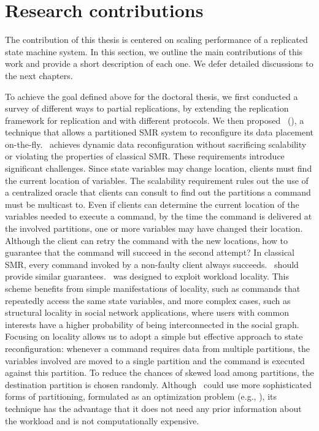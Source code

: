 \section{Research contributions}
\label{sec:contribution}


The contribution of this thesis is centered on scaling performance of a
replicated state machine system. In this section, we outline the main
contributions of this work and provide a short description of each one. We defer
detailed discussions to the next chapters.


To achieve the goal defined above for the doctoral thesis, we first conducted a
survey of different ways to partial replications, by extending the replication
framework for replication \cite{pedone:replication} and with different protocols.
We then proposed \textbf{\dssmrlong}\ (\dssmr), a technique that allows a
partitioned SMR system to reconfigure its data placement on-the-fly. \dssmr\
achieves dynamic data reconfiguration without sacrificing scalability or
violating the properties of classical SMR. These requirements introduce
significant challenges. Since state variables may change location, clients must
find the current location of variables. The scalability requirement rules out
the use of a centralized oracle that clients can consult to find out the
partitions a command must be multicast to. Even if clients can determine the
current location of the variables needed to execute a command, by the time the
command is delivered at the involved partitions, one or more variables may have
changed their location. Although the client can retry the command with the new
locations, how to guarantee that the command will succeed in the second attempt?
In classical SMR, every command invoked by a non-faulty client always succeeds.
\dssmr\ should provide similar guarantees. \dssmr\ was designed to exploit
workload locality. This scheme benefits from simple manifestations of locality,
such as commands that repeatedly access the same state variables, and more
complex cases, such as structural locality in social network applications, where
users with common interests have a higher probability of being interconnected in
the social graph. Focusing on locality allows us to adopt a simple but effective
approach to state reconfiguration: whenever a command requires data from
multiple partitions, the variables involved are moved to a single partition and
the command is executed against this partition. To reduce the chances of skewed
load among partitions, the destination partition is chosen randomly. Although
\dssmr\ could use more sophisticated forms of partitioning, formulated as an
optimization problem (e.g., \cite{curino2010sch,taft2014est}), its technique has
the advantage that it does not need any prior information about the workload and
is not computationally expensive.


